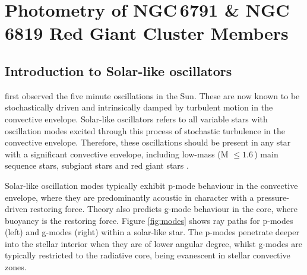\chapter{Photometry of NGC\,6791 \& NGC\,6819 Red Giant Cluster Members}
\label{chap:red_giants}

\newpage

\section{Introduction to Solar-like oscillators}

\cite{leighton_velocity_1962} first observed the five minute oscillations in the Sun. These are now known to be stochastically driven and intrinsically damped by turbulent motion in the convective envelope. Solar-like oscillators refers to all variable stars with oscillation modes excited through this process of stochastic turbulence in the convective envelope. Therefore, these oscillations should be present in any star with a significant convective envelope, including low-mass (M $\leq 1.6$\,\Msol{}) main sequence stars, subgiant stars and red giant stars \citep{aerts_current_2008}. 

Solar-like oscillation modes typically exhibit p-mode behaviour in the convective envelope, where they are predominantly acoustic in character with a pressure-driven restoring force. Theory also predicts g-mode behaviour in the core, where buoyancy is the restoring force. Figure \ref{fig:modes} shows ray paths for p-modes (left) and g-modes (right) within a solar-like star. The p-modes penetrate deeper into the stellar interior when they are of lower angular degree, whilst g-modes are typically restricted to the radiative core, being evanescent in stellar convective zones.

